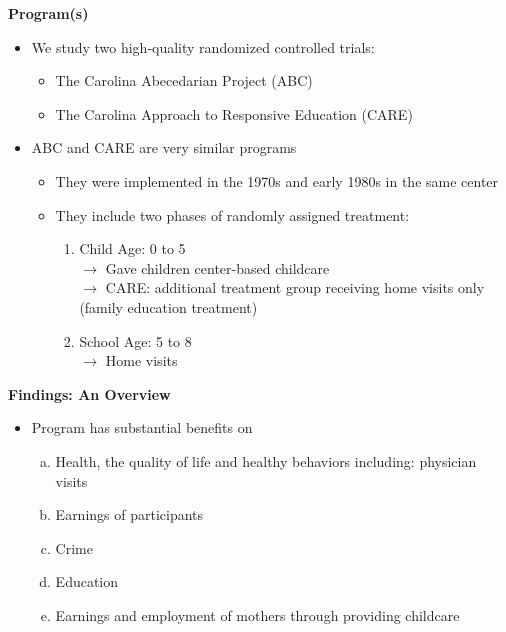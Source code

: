 \documentclass[static]{JJH-Beamer}
\begin{document}
\begin{frame}

\begin{center}
\textbf{Program(s)}
\end{center}

\begin{itemize}
\item We study two high-quality randomized controlled trials:
	\begin{itemize}
	\item The Carolina Abecedarian Project (ABC)
	\item The Carolina Approach to Responsive Education (CARE)
	\end{itemize}
\item ABC and CARE are very similar programs
	\begin{itemize}
	\item They were implemented in the 1970s and early 1980s in the same center
	\item They include two phases of randomly assigned treatment:
		\begin{enumerate}
		\item Child Age: 0 to 5 \\
			$\rightarrow$ Gave children center-based childcare\\
            $\rightarrow$ CARE: additional treatment group receiving home visits only (family education treatment)
		\item School Age: 5 to 8 \\
			$\rightarrow$ Home visits				
		\end{enumerate}
	\end{itemize}
\end{itemize}

\end{frame}

\begin{frame}

\begin{center}
\textbf{Findings: An Overview}
\end{center}

\begin{itemize}
\item Program has substantial benefits on
    \begin{enumerate}[(a)]
    \item Health, the quality of life and healthy behaviors including: physician visits
    \item Earnings of participants
    \item Crime
    \item Education
    \item Earnings and employment of mothers through providing childcare
    \end{enumerate}
\end{itemize}

\end{frame}
\end{document}
